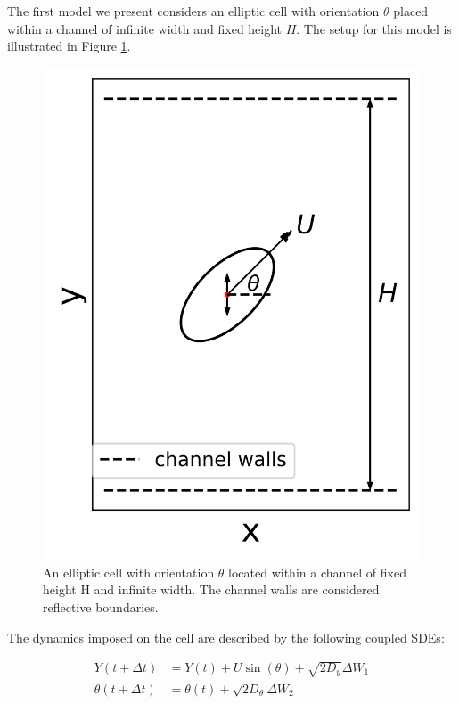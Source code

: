 The first model we present considers an elliptic cell with orientation $\theta$ placed within a
channel of infinite width and fixed height $H$. The setup for this model is illustrated
in Figure \ref{fig:model1_setup}.

\begin{figure}[htbp]
    \centering
    \includegraphics[scale=0.5]{graphics/model1_setup.png}
    \caption{An elliptic cell with orientation $\theta$ located within a channel of fixed height H
    and infinite width. The channel walls are considered reflective boundaries.}
    \label{fig:model1_setup}
\end{figure}

The dynamics imposed on the cell are described by the following coupled SDEs:

\begin{subequations}\label{eq:model1_sdes}
    \begin{align}
        Y(t + \Delta t) &= Y(t) + U \sin(\theta) + \sqrt{2D_y}\Delta W_1 \label{eq:model1_sdes_a} \\
        \theta(t + \Delta t) &= \theta(t) + \sqrt{2D_\theta}\Delta W_2 \label{eq:model1_sdes_b}
    \end{align}
\end{subequations}


